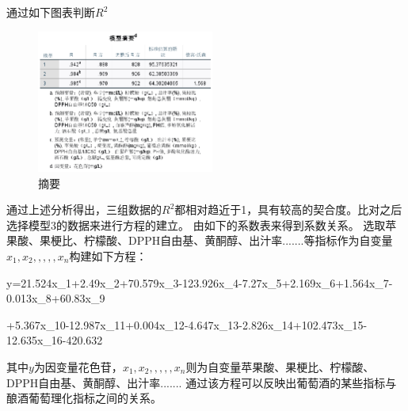 \documentclass[UTF8]{ctexart}
\begin{document}
								通过如下图表判断${R^2}$
							\begin{figure}[H]\centering
								\includegraphics[width=0.52\textwidth,height=0.45\textwidth]{img/摘要表.png} %
								\caption{摘要} %
								\label{fig:figure 7} %
								\end{figure}
								通过上述分析得出，三组数据的${R^2}$都相对趋近于1，具有较高的契合度。比对之后选择模型3的数据来进行方程的建立。
								由如下的系数表来得到系数关系。
								选取苹果酸、果梗比、柠檬酸、DPPH自由基、黄酮醇、出汁率.......等指标作为自变量${x_1,x_2,,,,,x_n}$构建如下方程：

								y=21.524{x_1}+2.49{x_2}+70.579{x_3}-123.926{x_4}-7.27{x_5}+2.169{x_6}+1.564{x_7}-0.013{x_8}+60.83{x_9}
								
								+5.367{x_{10}}-12.987{x_{11}}+0.004{x_{12}}-4.647{x_{13}}-2.826{x_{14}}+102.473{x_{15}}-12.635{x_{16}}-420.632
		
								其中$y$为因变量花色苷，${x_1,x_2,,,,,x_n}$则为自变量苹果酸、果梗比、柠檬酸、DPPH自由基、黄酮醇、出汁率.......
								通过该方程可以反映出葡萄酒的某些指标与酿酒葡萄理化指标之间的关系。
									

					



					

			







		   
		   


		   
		

		
		
		
		
\end{document}
